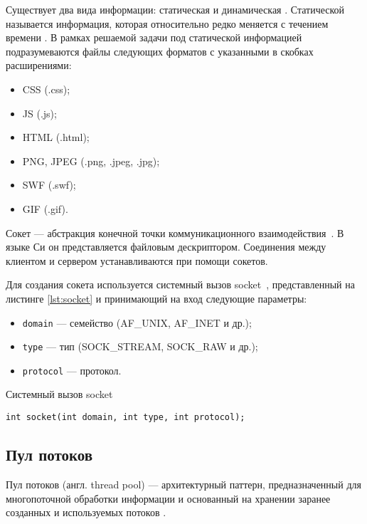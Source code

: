 Существует два вида информации: статическая и динамическая \cite{аршакян2013оценка}.
Статической называется информация, которая относительно редко меняется с течением времени \cite{аршакян2013оценка}.
В рамках решаемой задачи под статической информацией подразумеваются файлы следующих форматов с указанными в скобках расширениями:
\begin{itemize}
	\item CSS (.css);
	\item JS (.js);
	\item HTML (.html);
	\item PNG, JPEG (.png, .jpeg, .jpg);
	\item SWF (.swf);
	\item GIF (.gif).
\end{itemize}


Сокет --- абстракция конечной точки коммуникационного взаимодействия~\cite{ryazan2023os}.
В языке Си он представляется файловым дескриптором.
Соединения между клиентом и сервером устанавливаются при помощи сокетов.

Для создания сокета используется системный вызов socket~\cite{kerrisk2010linux}, представленный на листинге \ref{lst:socket} и принимающий на вход следующие параметры:
\begin{itemize}
	\item \texttt{domain} --- семейство (AF\_UNIX, AF\_INET и др.);
	\item \texttt{type} --- тип (SOCK\_STREAM, SOCK\_RAW и др.);
	\item \texttt{protocol} --- протокол.
\end{itemize}

\begin{listing}[!h]
	\caption{Системный вызов socket}
	\label{lst:socket}
	\begin{verbatim}
int socket(int domain, int type, int protocol);
	\end{verbatim}
\end{listing}

\subsection{Пул потоков}

Пул потоков (англ. thread pool) --- архитектурный паттерн, предназначенный для многопоточной обработки информации и основанный на хранении заранее созданных и используемых потоков \cite{опарин2022многопоточность}.


